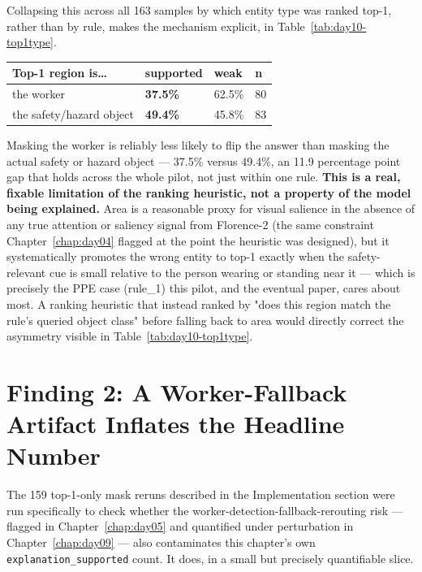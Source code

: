Collapsing this across all 163 samples by which entity type was ranked top-1, rather than by rule, makes
the mechanism explicit, in Table~\ref{tab:day10-top1type}.

\begin{center}
\begin{tabular}{p{4.2cm}p{2.0cm}p{1.6cm}p{1.2cm}}
\toprule
\textbf{Top-1 region is\ldots} & \textbf{supported} & \textbf{weak} & \textbf{n} \\
\midrule
the worker & \textbf{37.5\%} & 62.5\% & 80 \\
the safety/hazard object & \textbf{49.4\%} & 45.8\% & 83 \\
\bottomrule
\end{tabular}
\label{tab:day10-top1type}
\end{center}

Masking the worker is reliably less likely to flip the answer than masking the actual safety or hazard
object --- 37.5\% versus 49.4\%, an 11.9 percentage point gap that holds across the whole pilot, not
just within one rule. \textbf{This is a real, fixable limitation of the ranking heuristic, not a
property of the model being explained.} Area is a reasonable proxy for visual salience in the absence
of any true attention or saliency signal from Florence-2 (the same constraint Chapter~\ref{chap:day04}
flagged at the point the heuristic was designed), but it systematically promotes the wrong entity to
top-1 exactly when the safety-relevant cue is small relative to the person wearing or standing near it
--- which is precisely the PPE case (rule\_1) this pilot, and the eventual paper, cares about most. A
ranking heuristic that instead ranked by "does this region match the rule's queried object class"
before falling back to area would directly correct the asymmetry visible in
Table~\ref{tab:day10-top1type}.

\section{Finding 2: A Worker-Fallback Artifact Inflates the Headline Number}

The 159 top-1-only mask reruns described in the Implementation section were run specifically to check
whether the worker-detection-fallback-rerouting risk --- flagged in Chapter~\ref{chap:day05} and
quantified under perturbation in Chapter~\ref{chap:day09} --- also contaminates this chapter's own
\texttt{explanation\_supported} count. It does, in a small but precisely quantifiable slice.

